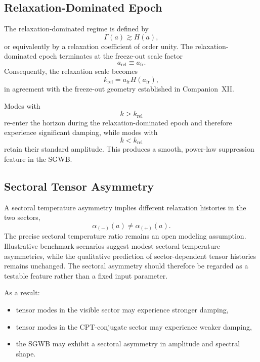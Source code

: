\documentclass[11pt,a4paper]{article}
\begin{document}
\subsection{Relaxation-Dominated Epoch}

The relaxation-dominated regime is defined by
\begin{equation}
  \Gamma(a) \gtrsim H(a),
\end{equation}
or equivalently by a relaxation coefficient of order unity. The
relaxation-dominated epoch terminates at the freeze-out scale factor
\begin{equation}
  a_{\mathrm{rel}}
  \equiv
  a_{\mathrm{fr}}.
\end{equation}
Consequently, the relaxation scale becomes
\begin{equation}
  k_{\mathrm{rel}}
  =
  a_{\mathrm{fr}} H(a_{\mathrm{fr}}),
\end{equation}
in agreement with the freeze-out geometry established in Companion~XII.

Modes with
\begin{equation}
  k > k_{\mathrm{rel}}
\end{equation}
re-enter the horizon during the relaxation-dominated epoch and therefore
experience significant damping, while modes with
\begin{equation}
  k < k_{\mathrm{rel}}
\end{equation}
retain their standard amplitude. This produces a smooth, power-law
suppression feature in the SGWB.

\subsection{Sectoral Tensor Asymmetry}

A sectoral temperature asymmetry implies different relaxation histories in
the two sectors,
\begin{equation}
  \alpha_{(-)}(a) \neq \alpha_{(+)}(a).
\end{equation}
The precise sectoral temperature ratio remains an open modeling assumption.
Illustrative benchmark scenarios suggest modest sectoral temperature
asymmetries, while the qualitative prediction of sector-dependent tensor
histories remains unchanged. The sectoral asymmetry should therefore be
regarded as a testable feature rather than a fixed input parameter.

As a result:
\begin{itemize}
  \item tensor modes in the visible sector may experience stronger damping,
  \item tensor modes in the CPT-conjugate sector may experience weaker
        damping,
  \item the SGWB may exhibit a sectoral asymmetry in amplitude and spectral
        shape.
\end{itemize}
\end{document}
